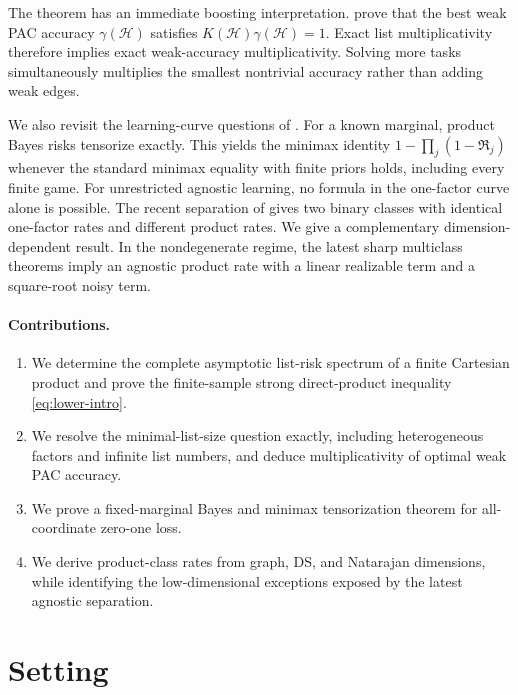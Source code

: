 \documentclass{article}
\theoremstyle{definition}
\theoremstyle{remark}
\newcommand{\cH}{\mathcal H}
\newcommand{\Risk}{\mathfrak R}
\newcommand{\1}{\mathbf 1}
\begin{document}
The theorem has an immediate boosting interpretation. \citet{brukhim2023boosting} prove that the best weak PAC accuracy \(\gamma(\cH)\) satisfies \(K(\cH)\gamma(\cH)=1\). Exact list multiplicativity therefore implies exact weak-accuracy multiplicativity. Solving more tasks simultaneously multiplies the smallest nontrivial accuracy rather than adding weak edges.

We also revisit the learning-curve questions of \citet{hanneke2024direct}. For a known marginal, product Bayes risks tensorize exactly. This yields the minimax identity \(1-\prod_j(1-\Risk_j)\) whenever the standard minimax equality with finite priors holds, including every finite game. For unrestricted agnostic learning, no formula in the one-factor curve alone is possible. The recent separation of \citet{more2026separation} gives two binary classes with identical one-factor rates and different product rates. We give a complementary dimension-dependent result. In the nondegenerate regime, the latest sharp multiclass theorems imply an agnostic product rate with a linear realizable term and a square-root noisy term.

\paragraph{Contributions.}
\begin{enumerate}
\item We determine the complete asymptotic list-risk spectrum of a finite Cartesian product and prove the finite-sample strong direct-product inequality \eqref{eq:lower-intro}.
\item We resolve the minimal-list-size question exactly, including heterogeneous factors and infinite list numbers, and deduce multiplicativity of optimal weak PAC accuracy.
\item We prove a fixed-marginal Bayes and minimax tensorization theorem for all-coordinate zero-one loss.
\item We derive product-class rates from graph, DS, and Natarajan dimensions, while identifying the low-dimensional exceptions exposed by the latest agnostic separation.
\end{enumerate}

\section{Setting}
\label{sec:setting}
\end{document}
